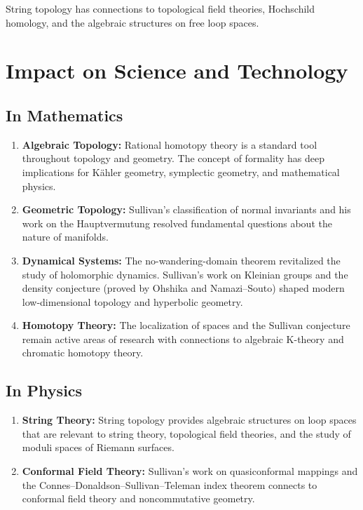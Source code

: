String topology has connections to topological field theories, Hochschild homology, and the algebraic structures on free loop spaces.

\section{Impact on Science and Technology}

\subsection{In Mathematics}

\begin{enumerate}
    \item \textbf{Algebraic Topology:} Rational homotopy theory is a standard tool throughout topology and geometry. The concept of formality has deep implications for K\"ahler geometry, symplectic geometry, and mathematical physics.
    \item \textbf{Geometric Topology:} Sullivan's classification of normal invariants and his work on the Hauptvermutung resolved fundamental questions about the nature of manifolds.
    \item \textbf{Dynamical Systems:} The no-wandering-domain theorem revitalized the study of holomorphic dynamics. Sullivan's work on Kleinian groups and the density conjecture (proved by Ohshika and Namazi--Souto) shaped modern low-dimensional topology and hyperbolic geometry.
    \item \textbf{Homotopy Theory:} The localization of spaces and the Sullivan conjecture remain active areas of research with connections to algebraic K-theory and chromatic homotopy theory.
\end{enumerate}

\subsection{In Physics}

\begin{enumerate}
    \item \textbf{String Theory:} String topology provides algebraic structures on loop spaces that are relevant to string theory, topological field theories, and the study of moduli spaces of Riemann surfaces.
    \item \textbf{Conformal Field Theory:} Sullivan's work on quasiconformal mappings and the Connes--Donaldson--Sullivan--Teleman index theorem connects to conformal field theory and noncommutative geometry.
\end{enumerate}

